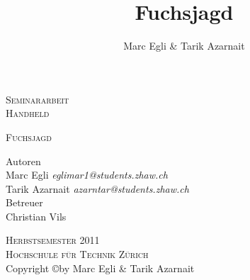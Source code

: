 
\begin{titlepage}
\author{Marc Egli \& Tarik Azarnait} 
\title{Fuchsjagd} 
\date{} 
\begin{center}

\Large
\textsc{Seminararbeit}\\
\textsc{Handheld}\\



\vspace{0.5cm}
\begin{center}
\end{center}
\textsc{Fuchsjagd} 
\vspace{1cm}

\large
Autoren\\
Marc Egli \textsl{eglimar1@students.zhaw.ch}\\
Tarik Azarnait \textsl{azarntar@students.zhaw.ch}\\

\vspace{1cm}
Betreuer\\
Christian Vils\\
\vspace{1.0cm}




\textsc{Herbstsemester 2011}\\
\textsc{Hochschule für Technik Zürich}\\
\vspace{0.5cm}
\normalsize
Copyright \copyright  by Marc Egli \& Tarik Azarnait

\end{center}

\end{titlepage}
\newpage
